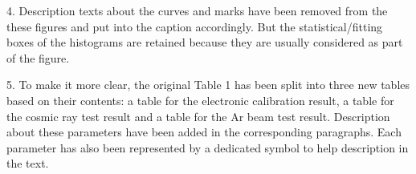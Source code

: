 \documentclass[]{article}
\begin{document}
4. Description texts about the curves and marks have been removed from the these figures and put into the caption accordingly. But the statistical/fitting boxes of the histograms are retained because they are usually considered as part of the figure.

5. To make it more clear, the original Table 1 has been split into three new tables based on their contents: a table for the electronic  calibration result, a table for the cosmic ray test result and a table for the Ar beam test result. Description about these parameters have been added in the corresponding paragraphs. Each parameter has also been represented by a dedicated symbol to help description in the text.
\end{document}
